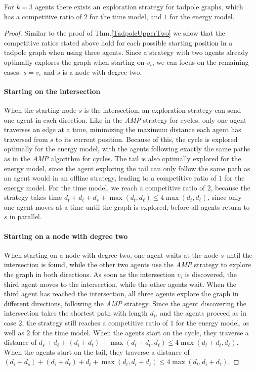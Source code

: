 \begin{theorem}\label{TadpoleUpperThree}
    For $k=3$ agents there exists an exploration strategy for tadpole graphs, which has a competitive ratio of $2$ for the time model, and $1$ for the energy model.
\end{theorem}

\begin{proof}
Similar to the proof of Thm.\ref{TadpoleUpperTwo} we show that the competitive ratios stated above hold for each possible starting position
in a tadpole graph when using three agents. Since a strategy with two agents already optimally explores the graph when starting on $v_t$,
we can focus on the remaining cases: $s = v_i$ and $s$ is a node with degree two.

\paragraph*{Starting on the intersection} 
When the starting node $s$ is the intersection, an exploration strategy can send one agent in each direction. Like in the \textit{AMP} strategy for cycles, only one
agent traverses an edge at a time, minimizing the maximum distance each agent has traversed from $s$ to its current position. Because of this, the cycle is explored
optimally for the energy model, with the agents following exactly the same paths as in the \textit{AMP} algorithm for cycles. The tail is also optimally explored for
the energy model, since the agent exploring the tail can only follow the same path as an agent would in an offline strategy, leading to a competitive ratio of $1$ for the energy model.
For the time model, we reach a competitive ratio of $2$, because the strategy takes time $d_t + d_\ell + d_s + \max(d_t,d_\ell) \leq 4\max(d_t,d_\ell)$, since only one agent moves
at a time until the graph is explored, before all agents return to $s$ in parallel.

\paragraph*{Starting on a node with degree two}
When starting on a node with degree two, one agent waits at the node $s$ until the intersection is found, while the other two agents use the \textit{AMP} strategy to
explore the graph in both directions. As soon as the intersection $v_i$ is discovered, the third agent moves to the intersection, while the other agents wait. When the third agent has reached the intersection,
all three agents explore the graph in different directions, following the \textit{AMP} strategy. Since the agent discovering the intersection takes the shortest path with length $d_i$, 
and the agents proceed as in case 2, the strategy still reaches a competitive ratio of $1$ for the energy model, as well as $2$ for the time model. When the agents start on the cycle, they
traverse a distance of $d_s + d_\ell + (d_i + d_t) + \max(d_i + d_t, d_\ell) \leq 4\max(d_i + d_t, d_\ell)$. When the agents start on the tail, they traverse a distance of 
$(d_i + d_s) + (d_i + d_\ell) + d_t + \max(d_t, d_i + d_\ell) \leq 4\max(d_t, d_i + d_\ell)$.
\end{proof}

